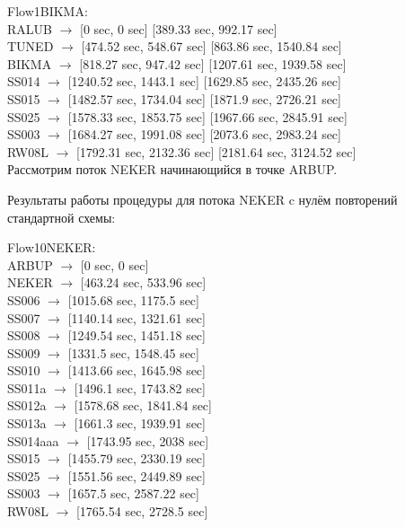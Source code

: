\documentclass[12pt, a4 paper]{article}
\begin{document}
\noindent Flow1BIKMA:\\
RALUB $\rightarrow$ [0 sec, 0 sec] [389.33 sec, 992.17 sec]\\
TUNED $\rightarrow$ [474.52 sec, 548.67 sec] [863.86 sec, 1540.84 sec]\\
BIKMA $\rightarrow$ [818.27 sec, 947.42 sec] [1207.61 sec, 1939.58 sec]\\
SS014 $\rightarrow$ [1240.52 sec, 1443.1 sec] [1629.85 sec, 2435.26 sec]\\
SS015 $\rightarrow$ [1482.57 sec, 1734.04 sec] [1871.9 sec, 2726.21 sec]\\
SS025 $\rightarrow$ [1578.33 sec, 1853.75 sec] [1967.66 sec, 2845.91 sec]\\
SS003 $\rightarrow$ [1684.27 sec, 1991.08 sec] [2073.6 sec, 2983.24 sec]\\
RW08L $\rightarrow$ [1792.31 sec, 2132.36 sec] [2181.64 sec, 3124.52 sec]\\


Рассмотрим поток NEKER начинающийся в точке ARBUP.

Результаты работы процедуры для потока NEKER c нулём повторений стандартной схемы:

\noindent Flow10NEKER:\\
ARBUP $\rightarrow$ [0 sec, 0 sec]\\
NEKER $\rightarrow$ [463.24 sec, 533.96 sec]\\
SS006 $\rightarrow$ [1015.68 sec, 1175.5 sec]\\
SS007 $\rightarrow$ [1140.14 sec, 1321.61 sec]\\
SS008 $\rightarrow$ [1249.54 sec, 1451.18 sec]\\
SS009 $\rightarrow$ [1331.5 sec, 1548.45 sec]\\
SS010 $\rightarrow$ [1413.66 sec, 1645.98 sec]\\
SS011a $\rightarrow$ [1496.1 sec, 1743.82 sec]\\
SS012a $\rightarrow$ [1578.68 sec, 1841.84 sec]\\
SS013a $\rightarrow$ [1661.3 sec, 1939.91 sec]\\
SS014aaa $\rightarrow$ [1743.95 sec, 2038 sec]\\
SS015 $\rightarrow$ [1455.79 sec, 2330.19 sec]\\
SS025 $\rightarrow$ [1551.56 sec, 2449.89 sec]\\
SS003 $\rightarrow$ [1657.5 sec, 2587.22 sec]\\
RW08L $\rightarrow$ [1765.54 sec, 2728.5 sec]\\
\end{document}
